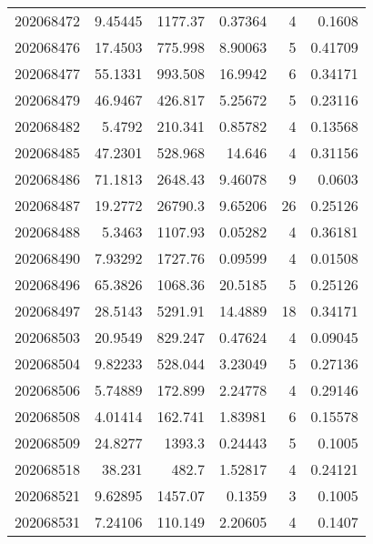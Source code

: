 \begin{tabular}{rrrrrr}
 202068472 &          9.45445 &     1177.37   &            0.37364 &           4 & 0.1608  \\
 202068476 &         17.4503  &      775.998  &            8.90063 &           5 & 0.41709 \\
 202068477 &         55.1331  &      993.508  &           16.9942  &           6 & 0.34171 \\
 202068479 &         46.9467  &      426.817  &            5.25672 &           5 & 0.23116 \\
 202068482 &          5.4792  &      210.341  &            0.85782 &           4 & 0.13568 \\
 202068485 &         47.2301  &      528.968  &           14.646   &           4 & 0.31156 \\
 202068486 &         71.1813  &     2648.43   &            9.46078 &           9 & 0.0603  \\
 202068487 &         19.2772  &    26790.3    &            9.65206 &          26 & 0.25126 \\
 202068488 &          5.3463  &     1107.93   &            0.05282 &           4 & 0.36181 \\
 202068490 &          7.93292 &     1727.76   &            0.09599 &           4 & 0.01508 \\
 202068496 &         65.3826  &     1068.36   &           20.5185  &           5 & 0.25126 \\
 202068497 &         28.5143  &     5291.91   &           14.4889  &          18 & 0.34171 \\
 202068503 &         20.9549  &      829.247  &            0.47624 &           4 & 0.09045 \\
 202068504 &          9.82233 &      528.044  &            3.23049 &           5 & 0.27136 \\
 202068506 &          5.74889 &      172.899  &            2.24778 &           4 & 0.29146 \\
 202068508 &          4.01414 &      162.741  &            1.83981 &           6 & 0.15578 \\
 202068509 &         24.8277  &     1393.3    &            0.24443 &           5 & 0.1005  \\
 202068518 &         38.231   &      482.7    &            1.52817 &           4 & 0.24121 \\
 202068521 &          9.62895 &     1457.07   &            0.1359  &           3 & 0.1005  \\
 202068531 &          7.24106 &      110.149  &            2.20605 &           4 & 0.1407  \\

\end{tabular}
